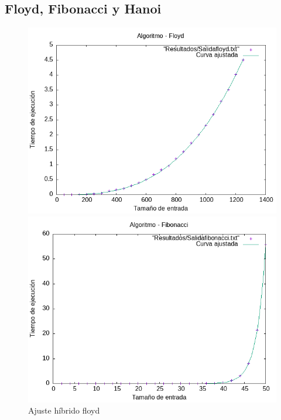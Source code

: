 \documentclass[11pt]{article}
\begin{document}
\subsection*{Floyd, Fibonacci y Hanoi}
\begin{figure}[H]
    \begin{minipage}{0.5\textwidth}
        \centering
        \includegraphics[width=\linewidth]{assets/AjusteHibrido_latex/Hibrido_fibonacci_floyd_hanoi/Floyd_hib.png}
        \caption{Ajuste híbrido floyd}
        \label{fig:floyd}
    \end{minipage}%
    \begin{minipage}{0.5\textwidth}
        \centering
        \includegraphics[width=\linewidth]{assets/AjusteHibrido_latex/Hibrido_fibonacci_floyd_hanoi/Fibonacci_hib.png}

\end{minipage}
\end{figure}
\end{document}
